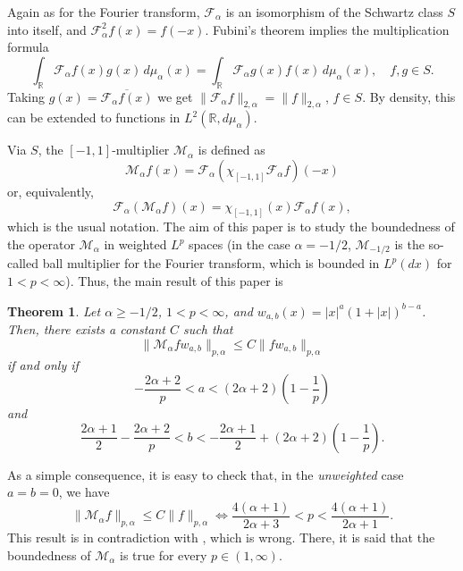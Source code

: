 \documentclass[a4paper]{amsart}
\theoremstyle{plain}
\newtheorem*{theorem}{Theorem}
\theoremstyle{remark}
\newcommand{\R}{\mathbb{R}}
\newcommand{\Fa}{\mathcal{F}_\alpha} %
\newcommand{\Ma}{\mathcal{M}_\alpha} %
\newcommand{\mua}{\mu_\alpha}
\newcommand{\pa}{{p,\alpha}}
\begin{document}
Again as for the Fourier transform, $\Fa$ is an isomorphism of the Schwartz class $S$ into itself, and $\Fa^2f(x) = f(-x)$. Fubini's theorem implies the multiplication formula
$$
  \int_\R \Fa f(x)g(x) \,d\mua(x)
  = \int_\R \Fa g(x)f(x) \,d\mua(x),
  \quad f,g \in S.
$$
Taking $g(x) = \overline{\Fa f(x)}$ we get $\|\Fa f\|_{2,\alpha} = \|f\|_{2,\alpha}$, $f \in S$. By density, this can be extended to functions in $L^2(\R,d\mua)$.

Via $S$, the $[-1,1]$-multiplier $\Ma$ is defined as
\begin{equation}
\label{eq:Ma}
  \Ma f(x) = \Fa(\chi_{[-1,1]} \Fa f)(-x)
\end{equation}
or, equivalently,
$$
  \Fa(\Ma f)(x) = \chi_{[-1,1]}(x)\Fa f(x),
$$
which is the usual notation.
The aim of this paper is to study the boundedness of the operator $\Ma$ in weighted $L^p$ spaces (in the case $\alpha=-1/2$, $\mathcal{M}_{-1/2}$ is the so-called ball multiplier for the Fourier transform, which is bounded in $L^p(dx)$ for $1<p<\infty$). Thus, the main result of this paper is

\begin{theorem}
\label{th:acotMab}
Let $\alpha \ge -1/2$, $1<p<\infty$, and
$w_{a,b}(x) = |x|^a (1+|x|)^{b-a}$.
Then, there exists a constant $C$ such that
\begin{equation}
\label{eq:acotMa}
   \|\Ma f w_{a,b}\|_\pa \le C \|fw_{a,b}\|_\pa
\end{equation} 
if and only if
\begin{equation*}
  -\frac{2\alpha+2}{p} < a < (2\alpha+2)\left(1-\frac1p\right)
\end{equation*}
and
\begin{equation*}
  \frac{2\alpha+1}{2} - \frac{2\alpha+2}{p}
    < b < -\frac{2\alpha+1}{2} + (2\alpha+2)\left(1-\frac1p\right).
\end{equation*}
\end{theorem}

As a simple consequence, it is easy to check that, in the \textit{unweighted} case $a=b=0$, we have
\begin{equation*}
  \|\Ma f\|_\pa \le C \|f\|_\pa
  \iff
  \frac{4(\alpha+1)}{2\alpha+3} < p < \frac{4(\alpha+1)}{2\alpha+1}.
\end{equation*}
This result is in contradiction with \cite[Corollary~3]{Sol}, which is wrong. There, it is said that the boundedness of $\Ma$ is true for every $p \in (1,\infty)$.
\end{document}

